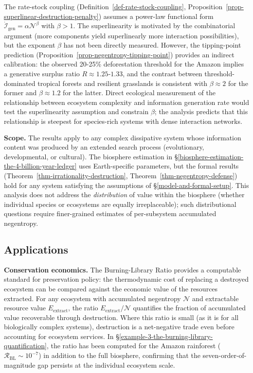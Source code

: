 \documentclass[11pt]{article}
\theoremstyle{plain}
\theoremstyle{definition}
\theoremstyle{remark}
\let\origsubsection\subsection
\renewcommand{\subsection}{\needspace{7\baselineskip}\origsubsection}
\begin{document}
The rate-stock coupling (Definition~\ref{def-rate-stock-coupling},
Proposition~\ref{prop-superlinear-destruction-penalty}) assumes a
power-law functional form
\(\dot{\mathcal{I}}_{\text{gen}} = \alpha \mathcal{N}^\beta\) with
\(\beta > 1\). The superlinearity is motivated by the combinatorial
argument (more components yield superlinearly more interaction
possibilities), but the exponent \(\beta\) has not been directly
measured. However, the tipping-point prediction
(Proposition~\ref{prop-negentropy-tipping-point}) provides an indirect
calibration: the observed 20-25\% deforestation threshold for the Amazon
\citep{LovejoyNobre2018} implies a generative surplus ratio
\(R \approx 1.25\)-\(1.33\), and the contrast between
threshold-dominated tropical forests and resilient grasslands is
consistent with \(\beta \approx 2\) for the former and
\(\beta \approx 1.2\) for the latter. Direct ecological measurement of
the relationship between ecosystem complexity and information generation
rate would test the superlinearity assumption and constrain \(\beta\);
the analysis predicts that this relationship is steepest for
species-rich systems with dense interaction networks.

\textbf{Scope.} The results apply to any complex dissipative system
whose information content was produced by an extended search process
(evolutionary, developmental, or cultural). The biosphere estimation in
§\ref{biosphere-estimation-the-4-billion-year-ledger} uses
Earth-specific parameters, but the formal results
(Theorem~\ref{thm-irrationality-destruction},
Theorem~\ref{thm-negentropy-defense}) hold for any system satisfying the
assumptions of §\ref{model-and-formal-setup}. This analysis does not
address the \emph{distribution} of value within the biosphere (whether
individual species or ecosystems are equally irreplaceable); such
distributional questions require finer-grained estimates of
per-subsystem accumulated negentropy.

\subsection{Applications}\label{applications}

\textbf{Conservation economics.} The Burning-Library Ratio provides a
computable standard for preservation policy: the thermodynamic cost of
replacing a destroyed ecosystem can be compared against the economic
value of the resources extracted. For any ecosystem with accumulated
negentropy \(\mathcal{N}\) and extractable resource value
\(E_{\text{extract}}\), the ratio \(E_{\text{extract}} / \mathcal{N}\)
quantifies the fraction of accumulated value recoverable through
destruction. Where this ratio is small (as it is for all biologically
complex systems), destruction is a net-negative trade even before
accounting for ecosystem services. In
§\ref{example-3-the-burning-library-quantification}, the ratio has been
computed for the Amazon rainforest
(\(\mathcal{R}_{\text{BL}} \sim 10^{-7}\)) in addition to the full
biosphere, confirming that the seven-order-of-magnitude gap persists at
the individual ecosystem scale.
\end{document}
